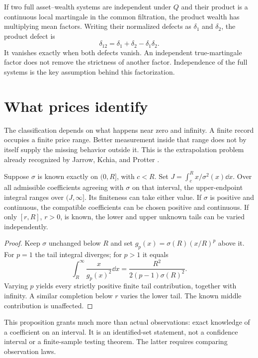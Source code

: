 If two full asset--wealth systems are independent under $Q$ and their
product is a continuous local martingale in the common filtration, the
product wealth has multiplying mean factors. Writing their normalized defects as
$\delta_1$ and $\delta_2$, the product defect is
\begin{equation}\label{eq:productdefect}
 \delta_{12}=\delta_1+\delta_2-\delta_1\delta_2.
\end{equation}
It vanishes exactly when both defects vanish. An independent
true-martingale factor does not remove the strictness of another factor.
Independence of the full systems is the key assumption behind this
factorization.

\section{What prices identify}\label{sec:identification}
The classification depends on what happens near zero and infinity. A finite
record occupies a finite price range. Better measurement inside that range
does not by itself supply the missing behavior outside it. This is the
extrapolation problem already recognized by Jarrow, Kchia, and Protter
\cite{jarrow2011detect}.

\begin{proposition}\label{prop:tails}
Suppose $\sigma$ is known exactly on $(0,R]$, with $c<R$. Set
$J=\int_c^R x/\sigma^2(x)\dd x$. Over all admissible coefficients agreeing
with $\sigma$ on that interval, the upper-endpoint integral ranges over
$(J,\infty]$. Its finiteness can take either value. If $\sigma$ is positive
and continuous, the compatible coefficients can be chosen positive and
continuous. If only $[r,R]$, $r>0$, is known, the lower and upper unknown tails
can be varied independently.
\end{proposition}

\begin{proof}
Keep $\sigma$ unchanged below $R$ and set
$g_p(x)=\sigma(R)(x/R)^p$ above it. For $p=1$ the tail integral diverges;
for $p>1$ it equals
\[
 \int_R^\infty \frac{x}{g_p(x)^2}\dd x
 =\frac{R^2}{2(p-1)\sigma(R)^2}.
\]
Varying $p$ yields every strictly positive finite tail contribution, together
with infinity. A similar completion below $r$ varies the lower tail. The
known middle contribution is unaffected.
\end{proof}

This proposition grants much more than actual observations: exact knowledge
of a coefficient on an interval. It is an identified-set statement, not a
confidence interval or a finite-sample testing theorem. The latter requires
comparing observation laws.

